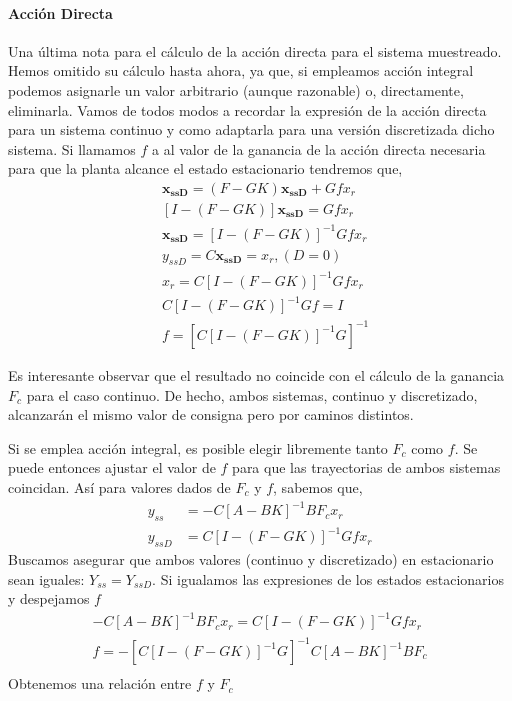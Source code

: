 \documentclass[10pt,a4paper]{report}
\begin{document}
\paragraph{Acción Directa} Una última nota para el cálculo de la acción directa para el sistema muestreado. Hemos omitido su cálculo hasta ahora, ya que, si empleamos acción integral podemos asignarle un valor arbitrario (aunque razonable) o, directamente, eliminarla. Vamos de todos modos a recordar la expresión de la acción directa para un sistema continuo y como adaptarla para una versión discretizada dicho sistema. Si llamamos $f$ a al valor de la ganancia de la acción directa necesaria para que la planta alcance el estado estacionario tendremos que,
\begin{align}
&\mathbf{x_{ssD}} = (F -GK)\mathbf{x_{ssD}} + Gfx_r\\
&\left[I-(F-GK) \right]\mathbf{x_{ssD}} =Gfx_r\\
&\mathbf{x_{ssD}} = \left[I-(F-GK) \right]^{-1}Gfx_r\\
&y_{ssD} = C\mathbf{x_{ssD}} = x_r, (D = 0)\\
&x_r = C\left[I-(F-GK) \right]^{-1}Gfx_r\\
&C\left[I-(F-GK) \right]^{-1}Gf = I\\
&f = \left[C\left[I-(F-GK) \right]^{-1}G\right]^{-1}
\end{align}

Es interesante observar que el resultado no coincide con el cálculo de la ganancia $F_c$ para el caso continuo. De hecho, ambos sistemas, continuo y discretizado, alcanzarán el mismo valor de consigna pero por caminos distintos. 

Si se emplea acción integral, es posible elegir libremente tanto $F_c$ como $f$. Se puede entonces ajustar el valor de $f$ para que las trayectorias de ambos sistemas coincidan. Así para valores dados de $F_c$ y $f$, sabemos que,
\begin{align}
y_{ss}  &= -C\left[A-BK\right]^{-1}BF_cx_r\\
y_{ssD} &= C\left[I-(F-GK) \right]^{-1}Gfx_r
\end{align}
Buscamos asegurar que ambos valores (continuo y discretizado) en estacionario sean iguales: $Y_{ss} = Y_{ssD}$. Si igualamos las expresiones de los estados estacionarios y despejamos $f$
\begin{align}
-C\left[A-BK\right]^{-1}BF_cx_r = C\left[I-(F-GK) \right]^{-1}Gfx_r\\
f = -\left[C\left[I-(F-GK) \right]^{-1}G\right]^{-1}C\left[A-BK\right]^{-1}BF_c  \\\label{eq429}
\end{align}
Obtenemos una relación entre $f$ y $F_c$
\end{document}
